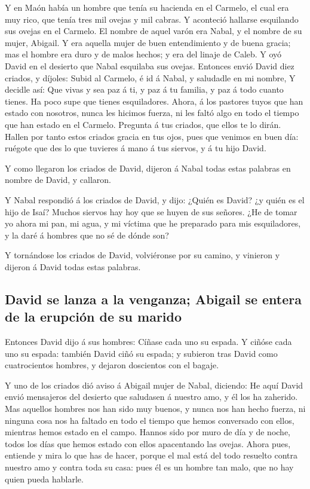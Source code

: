  Y en Maón había un hombre que tenía su hacienda en el
Carmelo, el cual era muy rico, que tenía tres mil ovejas y mil cabras. Y
aconteció hallarse esquilando sus ovejas en el Carmelo. 
El nombre de aquel varón era Nabal, y el nombre de su mujer, Abigail. Y
era aquella mujer de buen entendimiento y de buena gracia; mas el hombre
era duro y de malos hechos; y era del linaje de Caleb.  Y
oyó David en el desierto que Nabal esquilaba sus ovejas. 
Entonces envió David diez criados, y díjoles: Subid al Carmelo, é id á
Nabal, y saludadle en mi nombre,  Y decidle así: Que vivas
y sea paz á ti, y paz á tu familia, y paz á todo cuanto tienes.
 Ha poco supe que tienes esquiladores. Ahora, á los
pastores tuyos que han estado con nosotros, nunca les hicimos fuerza, ni
les faltó algo en todo el tiempo que han estado en el Carmelo.
 Pregunta á tus criados, que ellos te lo dirán. Hallen por
tanto estos criados gracia en tus ojos, pues que venimos en buen día:
ruégote que des lo que tuvieres á mano á tus siervos, y á tu hijo David.

 Y como llegaron los criados de David, dijeron á Nabal
todas estas palabras en nombre de David, y callaron.

 Y Nabal respondió á los criados de David, y dijo: ¿Quién
es David? ¿y quién es el hijo de Isaí? Muchos siervos hay hoy que se
huyen de sus señores.  ¿He de tomar yo ahora mi pan, mi
agua, y mi víctima que he preparado para mis esquiladores, y la daré á
hombres que no sé de dónde son?

 Y tornándose los criados de David, volviéronse por su
camino, y vinieron y dijeron á David todas estas palabras.

\hypertarget{david-se-lanza-a-la-venganza-abigail-se-entera-de-la-erupciuxf3n-de-su-marido}{%
\subsection{David se lanza a la venganza; Abigail se entera de la
erupción de su
marido}\label{david-se-lanza-a-la-venganza-abigail-se-entera-de-la-erupciuxf3n-de-su-marido}}

 Entonces David dijo á sus hombres: Cíñase cada uno su
espada. Y ciñóse cada uno su espada: también David ciñó su espada; y
subieron tras David como cuatrocientos hombres, y dejaron doscientos con
el bagaje.

 Y uno de los criados dió aviso á Abigail mujer de Nabal,
diciendo: He aquí David envió mensajeros del desierto que saludasen á
nuestro amo, y él los ha zaherido.  Mas aquellos hombres
nos han sido muy buenos, y nunca nos han hecho fuerza, ni ninguna cosa
nos ha faltado en todo el tiempo que hemos conversado con ellos,
mientras hemos estado en el campo.  Hannos sido por muro
de día y de noche, todos los días que hemos estado con ellos apacentando
las ovejas.  Ahora pues, entiende y mira lo que has de
hacer, porque el mal está del todo resuelto contra nuestro amo y contra
toda su casa: pues él es un hombre tan malo, que no hay quien pueda
hablarle.


